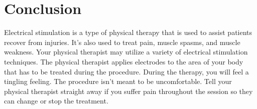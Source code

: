\documentclass[11pt]{article}
\begin{document}
\newpage
\section{Conclusion}
Electrical stimulation is a type of physical therapy that is used to assist patients recover from injuries. It's also used to treat pain, muscle spasms, and muscle weakness. Your physical therapist may utilize a variety of electrical stimulation techniques. 
The physical therapist applies electrodes to the area of your body that has to be treated during the procedure. During the therapy, you will feel a tingling feeling. The procedure isn't meant to be uncomfortable. Tell your physical therapist straight away if you suffer pain throughout the session so they can change or stop the treatment.

\begin{enumerate}
   
\end{enumerate}
\end{document}
